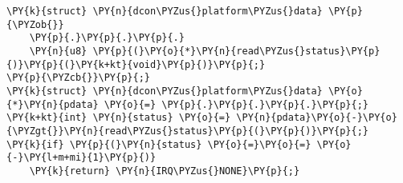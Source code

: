 \begin{Verbatim}[commandchars=\\\{\},codes={\catcode`\$=3\catcode`\^=7\catcode`\_=8}]
\PY{k}{struct} \PY{n}{dcon\PYZus{}platform\PYZus{}data} \PY{p}{\PYZob{}}
    \PY{p}{.}\PY{p}{.}\PY{p}{.}
    \PY{n}{u8} \PY{p}{(}\PY{o}{*}\PY{n}{read\PYZus{}status}\PY{p}{)}\PY{p}{(}\PY{k+kt}{void}\PY{p}{)}\PY{p}{;}
\PY{p}{\PYZcb{}}\PY{p}{;}
\PY{k}{struct} \PY{n}{dcon\PYZus{}platform\PYZus{}data} \PY{o}{*}\PY{n}{pdata} \PY{o}{=} \PY{p}{.}\PY{p}{.}\PY{p}{.}\PY{p}{;}
\PY{k+kt}{int} \PY{n}{status} \PY{o}{=} \PY{n}{pdata}\PY{o}{-}\PY{o}{\PYZgt{}}\PY{n}{read\PYZus{}status}\PY{p}{(}\PY{p}{)}\PY{p}{;}
\PY{k}{if} \PY{p}{(}\PY{n}{status} \PY{o}{=}\PY{o}{=} \PY{o}{-}\PY{l+m+mi}{1}\PY{p}{)}
    \PY{k}{return} \PY{n}{IRQ\PYZus{}NONE}\PY{p}{;}
\end{Verbatim}
